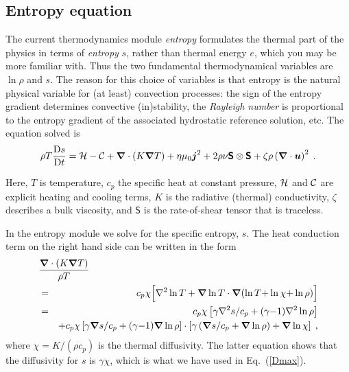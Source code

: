 \documentclass[\mydriver,12pt,twoside,notitlepage,a4paper]{article}
\makeatletter
\newcommand{\name}[2][]{%
  \def\index@{#1}%
  \textsl{#2\/}%
  \ifx\index@\@empty\index{#2@\MakeUppercase #2}%
  \else\index{#1}%
  \fi%
}
\newcommand{\De}      {\mathrm{D}}
\renewcommand{\vec}[1]{\mbox{\boldmath{$#1$}}}
\newcommand{\grad}    {\vec{\nabla}}
\newcommand{\Div}     {\vec{\nabla}\cdot}
\newcommand{\Laplace} {\nabla^2}
\newcommand{\jv}            {\vec{j}}
\newcommand{\uv}            {\vec{u}}
\newcommand{\Heat}          {{\cal H}}
\newcommand{\Cool}          {{\cal C}}
\newcommand{\Strain}        {\boldsymbol{\mathsf{S}}}
\makeatother
\begin{document}

\subsection{Entropy equation}
%
\label{entropy}%

The current thermodynamics module \name{entropy} formulates the thermal
part of the physics in terms of \emph{entropy} $s$, rather than thermal
energy $e$, which you may be more familiar with.
Thus the two fundamental thermodynamical variables are $\ln\rho$
and $s$.
The reason for this choice of variables is that entropy is the natural
physical variable for (at least) convection processes: the sign of the
entropy gradient determines convective (in)stability, the
\emph{Rayleigh number} is proportional to the entropy gradient
of the associated hydrostatic reference solution, etc.
The equation solved is
\begin{equation} \label{entropy-eq}
  \rho T\frac{\De s}{\De t}
   =  \Heat - \Cool
      + \Div(K\grad T)
      + \eta\mu_0 \jv^2
      + 2\rho\nu\Strain\otimes\Strain + \zeta\rho\left(\Div\uv\right)^2\; .
\end{equation}

Here, $T$ is temperature, $c_p$ the specific heat at constant pressure,
$\Heat$ and $\Cool$ are explicit heating and cooling terms,
$K$ is the radiative (thermal) conductivity, $\zeta$ describes a
bulk viscosity, and $\Strain$ is the rate-of-shear tensor that is traceless.

In the entropy module we solve for the specific entropy, $s$.
The heat conduction term on the right hand side can be written in the form
\begin{eqnarray}
\lefteqn{\frac{\Div(K\grad T)}
              {\rho T}} \\
%
  &=&
  c_p\chi\Bigl[
        \Laplace\ln T
        + \grad\ln T \cdot \grad(\ln T{+}\ln\chi{+}\ln\rho)
      \Bigr] \\
%
  &=&
  c_p\chi \left[ \gamma\Laplace s/c_p + (\gamma{-}1)\Laplace\ln\rho \right] \nonumber\\
  & &   + c_p\chi \left[ \gamma\grad s/c_p
                      + (\gamma{-}1)\grad\ln\rho \right]
          \cdot\left[ \gamma\left(\grad s/c_p + \grad\ln\rho\right)
                      + \grad\ln\chi \right] \; ,
\end{eqnarray}
where $\chi = K/(\rho c_p)$ is the thermal diffusivity.
The latter equation shows that the diffusivity for $s$ is $\gamma\chi$,
which is what we have used in Eq.~(\ref{Dmax}).
\end{document}
